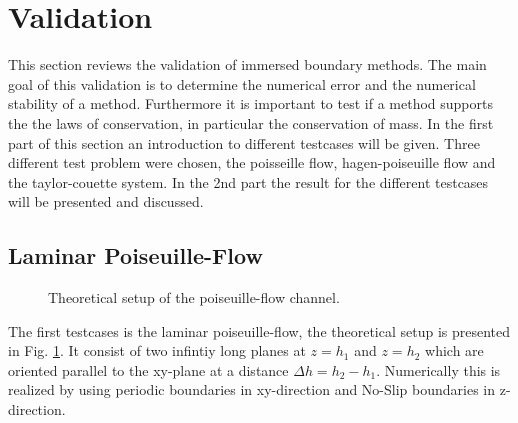 \section{Validation}

This section reviews the validation of immersed boundary methods.
The main goal of this validation is to determine the numerical error and the
numerical stability of a method.
Furthermore it is important to test if a  method supports the
the laws of conservation, in particular the conservation of mass.
In the first part of this section an introduction to different testcases
will be given. Three different test problem were chosen,
the poisseille flow, hagen-poiseuille flow and the taylor-couette system.
In the 2nd part the result for the different testcases will
be presented and discussed.


\subsection{Laminar Poiseuille-Flow}

\begin{figure}[!bp]
  \begin{minipage}[c]{0.6\textwidth}
      \centering
  \end{minipage}
  \begin{minipage}[c]{0.3\textwidth}
      \caption{Theoretical setup of the poiseuille-flow channel.
      \label{validation:setup_pf}
      }
  \end{minipage}
\end{figure}

The first testcases is the laminar poiseuille-flow, the theoretical setup is presented in Fig. \ref{validation:setup_pf}.
It consist of two infintiy long planes at $z=h_1$ and $z=h_2$ which are oriented
parallel to the xy-plane at a distance $\Delta h = h_2 - h_1$.
Numerically this is realized by using periodic boundaries in xy-direction and
No-Slip boundaries in z-direction.

